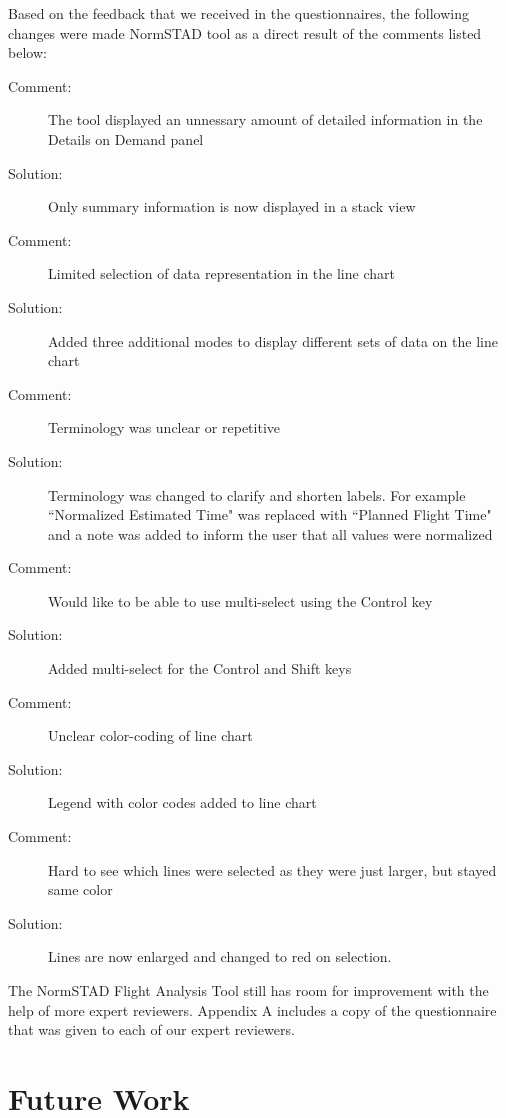 \documentclass{sig-alternate}
\begin{document}
Based on the feedback that we received in the questionnaires, the following changes
were made NormSTAD tool as a direct result of the comments listed below:
\begin{description}
	\item[Comment: ] The tool displayed an unnessary amount of detailed information
in the Details on Demand panel
	\item[Solution: ] Only summary information is now displayed in a stack view
	\item[Comment: ] Limited selection of data representation in the line chart
	\item[Solution: ] Added three additional modes to display different sets of data
on the line chart
	\item[Comment: ] Terminology was unclear or repetitive
	\item[Solution: ] Terminology was changed to clarify and shorten labels. For example
``Normalized Estimated Time" was replaced with ``Planned Flight Time" and a note was
added to inform the user that all values were normalized
	\item[Comment: ] Would like to be able to use multi-select using the Control key
	\item[Solution: ] Added multi-select for the Control and Shift keys
	\item[Comment: ] Unclear color-coding of line chart
	\item[Solution: ] Legend with color codes added to line chart
	\item[Comment: ] Hard to see which lines were selected as they were just larger, but
stayed same color
	\item[Solution: ] Lines are now enlarged and changed to red on selection.
\end{description}

The NormSTAD Flight Analysis Tool still has room for improvement with the help
of more expert reviewers. Appendix A includes a copy of the questionnaire that 
was given to each of our expert reviewers. 
  
	
\section{Future Work}
\label{sec-future-work}
\end{document}
